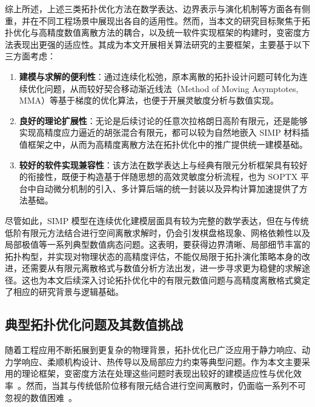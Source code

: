 综上所述，上述三类拓扑优化方法在数学表达、边界表示与演化机制等方面各有侧重，并在不同工程场景中展现出各自的适用性。然而，当本文的研究目标聚焦于拓扑优化与高精度数值离散方法的耦合，以及统一软件实现框架的构建时，变密度方法表现出更强的适应性。其成为本文开展相关算法研究的主要框架，主要基于以下三方面考虑：
\begin{enumerate}[
	label={（\arabic*）},
	labelsep=0.25em,
	leftmargin=3.2em,
	itemsep=0.4em,
	topsep=0.4em,
	parsep=0pt,
	partopsep=0pt
	]
	\item \textbf{建模与求解的便利性}：通过连续化松弛，原本离散的拓扑设计问题可转化为连续优化问题，从而较好契合移动渐近线法（Method of Moving Asymptotes, MMA）等基于梯度的优化算法，也便于开展灵敏度分析与数值实现。
	
	\item \textbf{良好的理论扩展性}：无论是后续讨论的任意次拉格朗日高阶有限元，还是能够实现高精度应力逼近的胡张混合有限元，都可以较为自然地嵌入 SIMP 材料插值框架之中，从而为高精度离散方法在拓扑优化中的推广提供统一建模基础。
	
	\item \textbf{较好的软件实现兼容性}：该方法在数学表达上与经典有限元分析框架具有较好的衔接性，既便于构造基于伴随思想的高效灵敏度分析流程，也为 SOPTX 平台中自动微分机制的引入、多计算后端的统一封装以及异构计算加速提供了方法基础。
\end{enumerate}

尽管如此，SIMP 模型在连续优化建模层面具有较为完整的数学表达，但在与传统低阶有限元方法结合进行空间离散求解时，仍会引发棋盘格现象、网格依赖性以及局部极值等一系列典型数值病态问题。这表明，要获得边界清晰、局部细节丰富的拓扑构型，并实现对物理状态的高精度评估，不能仅局限于拓扑演化策略本身的改进，还需要从有限元离散格式与数值分析方法出发，进一步寻求更为稳健的求解途径。这也为本文后续深入讨论拓扑优化中的有限元数值问题与高精度离散格式奠定了相应的研究背景与逻辑基础。


\subsection{典型拓扑优化问题及其数值挑战}
\label{subsec:top_problems_numerical_challenges}

随着工程应用不断拓展到更复杂的物理背景，拓扑优化已广泛应用于静力响应、动力学响应、柔顺机构设计、热传导以及局部应力约束等典型问题。作为本文主要采用的理论框架，变密度方法在处理这些问题时表现出较好的建模适应性与优化效率~\cite{sigmundTopologyOptimizationApproaches2013a}。然而，当其与传统低阶位移有限元结合进行空间离散时，仍面临一系列不可忽视的数值困难~\cite{sigmundNumericalInstabilitiesTopology1998}。

